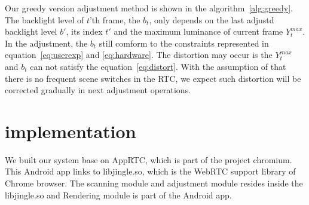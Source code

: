 Our greedy version adjustment method is shown in the
algorithm~\ref{alg:greedy}. The backlight level of $t$'th frame, the
$b_t$, only depends on the last adjustd backlight level $b'$, its
index $t'$ and the maximum luminance of current frame $Y_t^{max}$. In
the adjustment, the $b_t$ still comform to the constraints represented
in equation~\ref{eq:userexp} and \ref{eq:hardware}. The distortion may
occur is the $Y_t^{max}$ and $b_t$ can not satisfy the
equation~\ref{eq:distort}. With the assumption of that there is no
frequent scene switches in the RTC, we expect such distortion will be
corrected gradually in next adjustment operations.






\section{implementation}
\label{sec:implementation}

We built our system base on AppRTC, which is part of the project
chromium. This Android app links to libjingle.so, which is the WebRTC
support library of Chrome browser. The scanning module and adjustment
module resides inside the libjingle.so and Rendering module is part of
the Android app.










